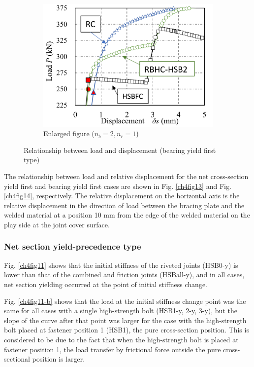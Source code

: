 \begin{figure}[htbp]
\begin{subfigure}[t]{0.48\textwidth}
    \label{ch4fig12-b}
    \end{subfigure}
    \hfill
    \begin{subfigure}[t]{0.48\textwidth}
    \includegraphics[width=\linewidth]{imgs/ch4/fig12-c.pdf}
    \caption{Enlarged figure ($n_b=2, n_r=1$)}
    \label{ch4fig12-c}
    \end{subfigure}
    \caption{Relationship between load and displacement (bearing yield first type)}
    \label{ch4fig12}
\end{figure}

The relationship between load and relative displacement for the net cross-section yield first and bearing yield first cases are shown in Fig. \ref{ch4fig13} and Fig. \ref{ch4fig14}, respectively. The relative displacement on the horizontal axis is the relative displacement in the direction of load between the bracing plate and the welded material at a position 10 mm from the edge of the welded material on the play side at the joint cover surface.

\subsubsection{Net section yield-precedence type}

Fig. \ref{ch4fig11} shows that the initial stiffness of the riveted joints (HSB0-y) is lower than that of the combined and friction joints (HSBall-y), and in all cases, net section yielding occurred at the point of initial stiffness change.

Fig. \ref{ch4fig11-b} shows that the load at the initial stiffness change point was the same for all cases with a single high-strength bolt (HSB1-y, 2-y, 3-y), but the slope of the curve after that point was larger for the case with the high-strength bolt placed at fastener position 1 (HSB1), the pure cross-section position. This is considered to be due to the fact that when the high-strength bolt is placed at fastener position 1, the load transfer by frictional force outside the pure cross-sectional position is larger.

